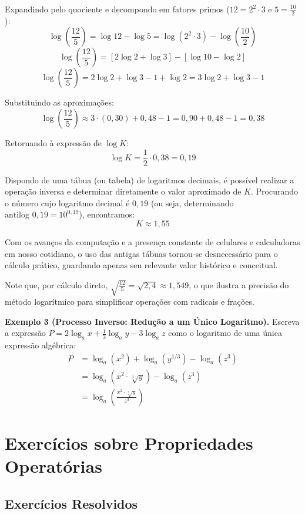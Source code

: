 \documentclass[12pt,a4paper]{report}
\begin{document}
	Expandindo pelo quociente e decompondo em fatores primos ($12 = 2^2 \cdot 3$ e $5 = \frac{10}{2}$):
	$$\log\left(\frac{12}{5}\right) = \log 12 - \log 5 = \log(2^2 \cdot 3) - \log\left(\frac{10}{2}\right)$$
	$$\log\left(\frac{12}{5}\right) = [2\log 2 + \log 3] - [\log 10 - \log 2]$$
	$$\log\left(\frac{12}{5}\right) = 2\log 2 + \log 3 - 1 + \log 2 = 3\log 2 + \log 3 - 1$$
	
	Substituindo as aproximações:
	$$\log\left(\frac{12}{5}\right) \approx 3 \cdot (0{,}30) + 0{,}48 - 1 = 0{,}90 + 0{,}48 - 1 = 0{,}38$$
	
	Retornando à expressão de $\log K$:
	$$\log K = \frac{1}{2} \cdot 0{,}38 = 0{,}19$$
	
	Dispondo de uma tábua (ou tabela) de logaritmos decimais, é possível realizar a operação inversa e determinar diretamente o valor aproximado de $K$. Procurando o número cujo logaritmo decimal é $0{,}19$ (ou seja, determinando $\text{antilog } 0{,}19 = 10^{0{,}19}$), encontramos:
	$$K \approx 1{,}55$$
	
	Com os avanços da computação e a presença constante de celulares e calculadoras em nosso cotidiano, o uso das antigas tábuas tornou-se desnecessário para o cálculo prático, guardando apenas seu relevante valor histórico e conceitual.
	
	Note que, por cálculo direto, $\sqrt{\frac{12}{5}} = \sqrt{2{,}4} \approx 1{,}549$, o que ilustra a precisão do método logarítmico para simplificar operações com radicais e frações.
	
	\vspace{0.3cm}
	
	\textbf{Exemplo 3 (Processo Inverso: Redução a um Único Logaritmo).}  
	Escreva a expressão $P = 2\log_a x + \frac{1}{3}\log_a y - 3\log_a z$ como o logaritmo de uma única expressão algébrica:
	\begin{align*}
		P &= \log_a (x^2) + \log_a \left(y^{1/3}\right) - \log_a (z^3) \\
		&= \log_a \left(x^2 \cdot \sqrt[3]{y}\right) - \log_a (z^3) \\
		&= \log_a \left(\frac{x^2 \cdot \sqrt[3]{y}}{z^3}\right)
	\end{align*}
	
	\section{Exercícios sobre Propriedades Operatórias}
	
	\subsection{Exercícios Resolvidos}
	
\end{document}
